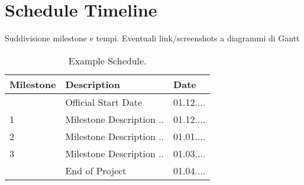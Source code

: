 \documentclass[a4paper]{scrreprt}
\begin{document}

\chapter{Schedule Timeline}
Suddivisione milestone e tempi. Eventuali link/screenshots a diagrammi di Gantt

\begin{table}[h]
\centering
\begin{tabular}{|l|l|l|}
\hline
Milestone & Description & Date \\\hline
& Official Start Date & 01.12.... \\
1 & Milestone Description ..  & 01.12.... \\
2 & Milestone Description ..  & 01.01.... \\
3 & Milestone Description ..  & 01.03.... \\
& End of Project & 01.04.... \\
\hline
\end{tabular}
\caption{\label{tab:schedule}Example Schedule.}
\end{table}
\end{document}
